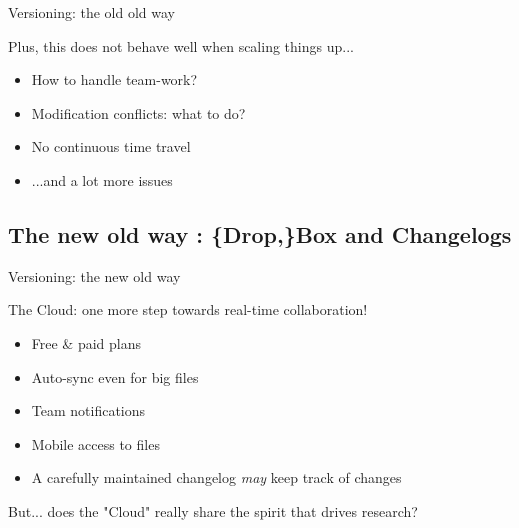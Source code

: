 \documentclass[10pt]{beamer}
\begin{document}
\begin{frame}{Versioning: the old old way} %

	Plus, this does not behave well when scaling things up...

	\begin{itemize}
		\item How to handle team-work?
		\item Modification conflicts: what to do?
		\item No continuous time travel
		\item ...and a lot more issues
	\end{itemize}

\end{frame}


\subsection{The new old way : \{Drop,\}Box and Changelogs} %

\begin{frame}{Versioning: the new old way} %

	The Cloud: one more step towards real-time collaboration!

	\begin{itemize}
		\item Free \& paid plans
		\item Auto-sync even for big files
		\item Team notifications
		\item Mobile access to files
		\item A carefully maintained changelog \emph{may} keep track of changes
	\end{itemize}

	\pause
	But...
	\pause
	does the "Cloud" really share the spirit that drives research?

\end{frame}
\end{document}
